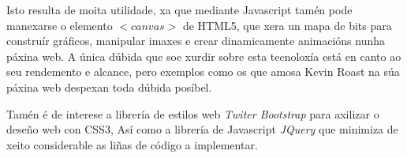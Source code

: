 		Isto resulta de moita utilidade, xa que mediante Javascript tamén pode manexarse o
		elemento $<canvas>$ de HTML5, que xera un mapa de bits para construír gráficos, 
		manipular imaxes e crear dinamicamente animacións nunha páxina web. A única dúbida que
		soe xurdir sobre esta tecnoloxía está en canto ao seu rendemento e alcance, pero
		exemplos como os que amosa Kevin Roast na súa páxina web\cite{kevin-roast-canvas-examples}
		despexan toda dúbida posíbel. 
		
		Tamén é de interese a librería de estilos web \emph{Twiter Bootstrap}
		\cite{bootstrap-page-url} para axilizar o deseño web con CSS3, Así como a 
		librería de Javascript \emph{JQuery} \cite{jquery-page-url} que minimiza de 
		xeito considerable as liñas de código a implementar.